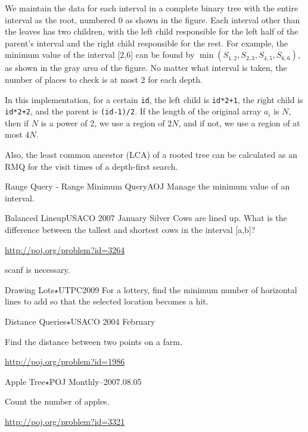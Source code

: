We maintain the data for each interval in a complete binary tree with the entire interval as the root, numbered 0 as shown in the figure. Each interval other than the leaves has two children, with the left child responsible for the left half of the parent's interval and the right child responsible for the rest.
For example, the minimum value of the interval [2,6] can be found by $\min(S_{1,2},S_{2,3},S_{4,5},S_{6,6})$, as shown in the gray area of the figure. No matter what interval is taken, the number of places to check is at most 2 for each depth.

In this implementation, for a certain \texttt{id}, the left child is \texttt{id*2+1}, the right child is \texttt{id*2+2}, and the parent is \texttt{(id-1)/2}.
If the length of the original array $a_i$ is $N$, then if $N$ is a power of 2, we use a region of $2N$, and if not, we use a region of at most $4N$.

Also, the least common ancestor (LCA) of a rooted tree can be calculated as an RMQ for the visit times of a depth-first search.
\pccbook[pp.~292--]

\begin{pbox}{Range Query - Range Minimum Query}{AOJ}
Manage the minimum value of an interval.

\end{pbox}

\begin{pbox}{Balanced Lineup}{USACO 2007 January Silver}
Cows are lined up. What is the difference between the tallest and shortest cows in the interval [a,b]?

\url{http://poj.org/problem?id=3264}
\end{pbox}

scanf is necessary.

\begin{pbox}{Drawing Lots$\star$}{UTPC2009}
For a lottery, find the minimum number of horizontal lines to add so that the selected location becomes a hit.

\end{pbox}

\begin{pbox}{Distance Queries$\star$}{USACO 2004 February}

Find the distance between two points on a farm.

\url{http://poj.org/problem?id=1986}
\end{pbox}


\begin{pbox}{Apple Tree$\star$}{POJ Monthly--2007.08.05}

Count the number of apples.

\url{http://poj.org/problem?id=3321}
\end{pbox}
